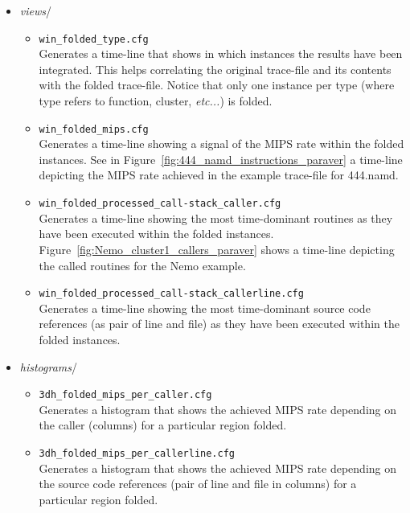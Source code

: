 \begin{itemize}
	\item \textit{views}/
	\begin{itemize}
		\item \texttt{win\_folded\_type.cfg}\\
		Generates a time-line that shows in which instances the \FOLDING results have been integrated. This helps correlating the original trace-file and its contents with the folded trace-file. Notice that only one instance per type (where type refers to function, cluster, \textit{etc...}) is folded.
		\item \texttt{win\_folded\_mips.cfg}\\
		Generates a time-line showing a signal of the MIPS rate within the folded instances. See in Figure~\ref{fig:444_namd_instructions_paraver} a time-line depicting the MIPS rate achieved in the example trace-file for 444.namd.
		\item \texttt{win\_folded\_processed\_call-stack\_caller.cfg}\\
		Generates a time-line showing the most time-dominant routines as they have been executed within the folded instances. Figure~\ref{fig:Nemo_cluster1_callers_paraver} shows a time-line depicting the called routines for the Nemo example.
		\item \texttt{win\_folded\_processed\_call-stack\_callerline.cfg}\\
		Generates a time-line showing the most time-dominant source code references (as pair of line and file) as they have been executed within the folded instances.
	\end{itemize}
	\item \textit{histograms}/
	\begin{itemize}
		\item \texttt{3dh\_folded\_mips\_per\_caller.cfg}\\
		Generates a histogram that shows the achieved MIPS rate depending on the caller (columns) for a particular region folded.
		\item \texttt{3dh\_folded\_mips\_per\_callerline.cfg}\\
		Generates a histogram that shows the achieved MIPS rate depending on the source code references (pair of line and file in columns) for a particular region folded.
	\end{itemize}
\end{itemize}



